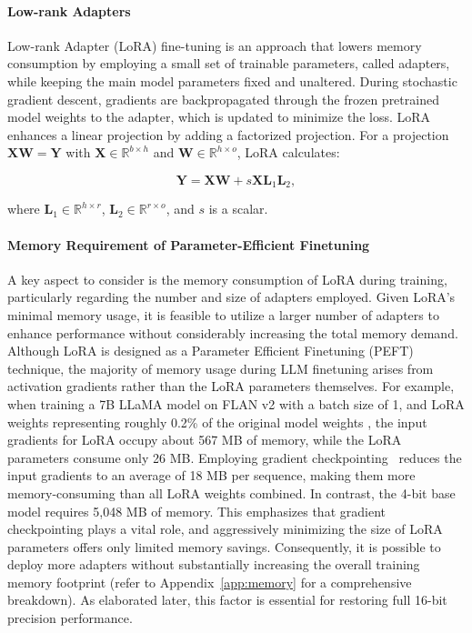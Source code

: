 \paragraph{Low-rank Adapters} Low-rank Adapter (LoRA) fine-tuning \citep{hu2021lora} is an approach that lowers memory consumption by employing a small set of trainable parameters, called adapters, while keeping the main model parameters fixed and unaltered. During stochastic gradient descent, gradients are backpropagated through the frozen pretrained model weights to the adapter, which is updated to minimize the loss. LoRA enhances a linear projection by adding a factorized projection. For a projection ${\mathbf{X} \mathbf{W} = \mathbf{Y}}$ with $\mathbf{X} \in \mathbb{R}^{b \times h}$ and $\mathbf{W} \in \mathbb{R}^{h \times o}$, LoRA calculates:

\begin{equation}
    \mathbf{Y} = \mathbf{X}\mathbf{W} + s\mathbf{X}\mathbf{L}_1\mathbf{L}_2,
\end{equation}

where $\mathbf{L}_1 \in \mathbb{R}^{h \times r}$, $\mathbf{L}_2 \in \mathbb{R}^{r \times o}$, and $s$ is a scalar.

\paragraph{Memory Requirement of Parameter-Efficient Finetuning} A key aspect to consider is the memory consumption of LoRA during training, particularly regarding the number and size of adapters employed. Given LoRA's minimal memory usage, it is feasible to utilize a larger number of adapters to enhance performance without considerably increasing the total memory demand. Although LoRA is designed as a Parameter Efficient Finetuning (PEFT) technique, the majority of memory usage during LLM finetuning arises from activation gradients rather than the LoRA parameters themselves. For example, when training a 7B LLaMA model on FLAN v2 with a batch size of 1, and LoRA weights representing roughly 0.2\% of the original model weights \citep{hu2021lora,liu2022few}, the input gradients for LoRA occupy about 567 MB of memory, while the LoRA parameters consume only 26 MB. Employing gradient checkpointing~\citep{chen2016training} reduces the input gradients to an average of 18 MB per sequence, making them more memory-consuming than all LoRA weights combined. In contrast, the 4-bit base model requires 5,048 MB of memory. This emphasizes that gradient checkpointing plays a vital role, and aggressively minimizing the size of LoRA parameters offers only limited memory savings. Consequently, it is possible to deploy more adapters without substantially increasing the overall training memory footprint (refer to Appendix~\ref{app:memory} for a comprehensive breakdown). As elaborated later, this factor is essential for restoring full 16-bit precision performance.

